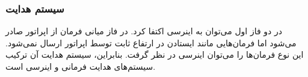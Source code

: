 \subsubsection{سیستم هدایت}
در دو فاز اول می‌توان به اینرسی اکتفا کرد. در فاز میانی فرمان از اپراتور صادر می‌شود اما فرمان‌هایی مانند ایستادن در ارتفاع ثابت توسط اپراتور ارسال نمی‌شود. این نوع فرمان‌ها را می‌توان اینرسی در نظر گرفت. بنابراین، سیستم هدایت آن ترکیب سیستم‌های هدایت فرمانی و اینرسی است.





















